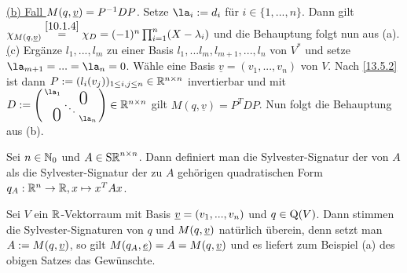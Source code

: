 \documentclass[../../main.tex]{subfiles}
\begin{document}
\begin{cproof}
\noindent\underline{(b) Fall $M(q,{\underline v})=P^{-1}DP$}. Setze $\la_i:= d_i$ für $i\in\{1,...,n\}$. Dann gilt $\chi_{M(q,{\underline v})}\stackrel{\ref{10.1.4}}{=}\chi_D=(-1)^n\prod_{i=1}^n(X-\lambda_i)$ und die Behauptung folgt nun aus (a).\\
		
\noindent\underline(c) Ergänze $l_1,...,l_m$ zu einer Basis $l_1,...l_m,l_{m+1},...,l_n$ von $V^*$ und setze $\la_{m+1}=...=\la_n=0$. Wähle eine Basis $\underline{v}=(v_1,...,v_n)$ von $V$. Nach \ref{13.5.2} ist dann $P:=(l_i(v_j))_{1\le i,j\le n}\in \mathbb R^{n\times n}$ invertierbar und mit $D:=\left(\begin{smallmatrix}
\la_1 & & \llap{$\overset{\blap{\LARGE 0}}{~}$} \\
& \ddots &\\
\rlap{\tlap{\LARGE 0}} & & \la_n\end{smallmatrix}\right)\in \R^{n\times n}$ gilt $M(q,\underline{v})=P^TDP$. Nun folgt die Behauptung aus (b). 
\end{cproof}

\begin{df}\label{14.1.3}
Sei $n\in \mathbb N_0$ und $A\in \operatorname{S\mathbb R}^{n\times n}$. Dann definiert man die Sylvester-Signatur der von $A$ als die Sylvester-Signatur der zu $A$ gehörigen quadratischen Form $q_A: \mathbb R^n\to \mathbb R, x\mapsto x^TAx$.
\end{df}
	
\begin{bem}\label{14.1.4}
Sei $V$ ein $\mathbb R$-Vektorraum mit Basis ${\underline v}=(v_1,...,v_n)$ und $q\in\operatorname{Q}(V)$. Dann stimmen die Sylvester-Signaturen von $q$ und $M(q,{\underline v})$ natürlich überein, denn setzt man $A:=M(q,{\underline v})$, so gilt $M(q_A,{\underline e})=A=M(q,{\underline v} )$ und es liefert zum Beispiel (a) des obigen Satzes das Gewünschte.
\end{bem}
\end{document}
